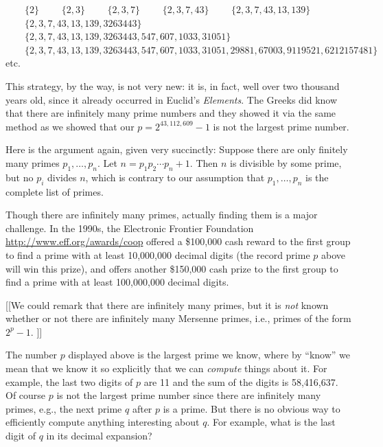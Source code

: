 \documentclass[11pt]{article}
\theoremstyle{plain}
\theoremstyle{definition}
\numberwithin{equation}{section}
\numberwithin{figure}{section}
\numberwithin{table}{section}
\begin{document}
$\mbox{}\qquad\{2\}$
\newline
$\mbox{}\qquad\{2,3\}$
\newline
$\mbox{}\qquad\{2,3, 7\}$
\newline
$\mbox{}\qquad\{2,3, 7, 43\}$
\newline
$\mbox{}\qquad\{2,3, 7, 43, 13, 139\}$
\newline
$\mbox{}\qquad\{2,3, 7, 43, 13, 139, 3263443\}$
\newline
$\mbox{}\qquad\{2,3, 7, 43, 13, 139, 3263443,  547, 607, 1033, 31051\}$
\newline
$\mbox{}\qquad\{2,3, 7, 43, 13, 139, 3263443,  547, 607, 1033, 31051, 29881, 67003,
9119521, 6212157481\}$
\newline
\mbox{}\qquad{}etc.

This strategy, by the way, is not very new: it is, in fact, well over
two thousand years old, since it already occurred in Euclid's {\em
  Elements}. The Greeks did know that there are infinitely many prime
numbers and they showed it via the same method as we showed that our
$p = 2^{43,112,609} - 1$ is not the largest prime number.

Here is the argument again, given very succinctly: Suppose there are
only finitely many primes $p_1, \ldots, p_n$.  Let $n=p_1 p_2 \cdots
p_n + 1$.  Then $n$ is divisible by some prime, but no $p_i$ divides
$n$, which is contrary to our assumption that $p_1, \ldots, p_n$ is
the complete list of primes.

Though there are infinitely many primes, actually finding them is a
major challenge.  In the 1990s, the Electronic Frontier Foundation
\url{http://www.eff.org/awards/coop} offered a \$100,000 cash reward
to the first group to find a prime with at least 10,000,000 decimal
digits (the record prime $p$ above will win this prize), and offers
another \$150,000 cash prize to the first group to find a prime with
at least 100,000,000 decimal digits.

[[We could remark that there are infinitely many primes, but it
is {\em not} known whether or not there are infinitely
many Mersenne primes, i.e., primes of the form $2^p - 1$. ]]

The number $p$ displayed above is the largest prime we know, where by
``know'' we mean that we know it so explicitly that we can {\em
  compute} things about it.  For example, the last two digits of $p$
are 11 and the sum of the digits is 58,416,637.  Of course $p$ is not
the largest prime number since there are infinitely many primes, e.g.,
the next prime $q$ after $p$ is a prime.  But there is no obvious way
to efficiently compute anything interesting about $q$.  For example,
what is the last digit of $q$ in its decimal expansion?
\end{document}
